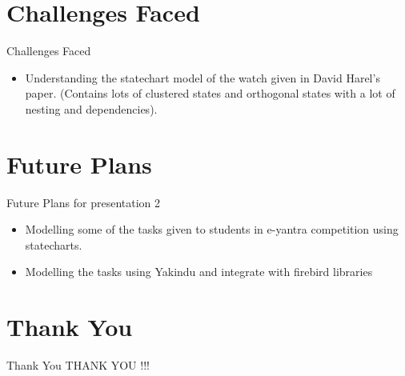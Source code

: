 \documentclass[10pt, a4paper]{beamer}
\begin{document}
\section{Challenges Faced}
\begin{frame}{Challenges Faced}
	\begin{itemize}
		\item Understanding the statechart model of the watch given in David Harel's paper. (Contains lots of clustered states and orthogonal states with a lot of nesting and dependencies). 
	\end{itemize}
\end{frame}

\section{Future Plans}
\begin{frame}{Future Plans for presentation 2}
	\begin{itemize}
		\item Modelling some of the tasks given to students in e-yantra
		competition using statecharts.
		\item Modelling the tasks using Yakindu and integrate with
		firebird libraries
	\end{itemize}
\end{frame}


\section{Thank You}
\begin{frame}{Thank You}
	\centering THANK YOU !!!
\end{frame}
\end{document}
